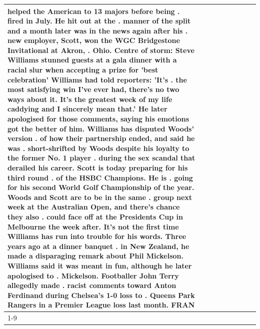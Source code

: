 \begin{table}[H]
\begin{tabular}{lllrlllll}
helped the American to 13 majors before being . fired in July. He hit out at the . manner of the split and a month later was in the news again after his . new employer, Scott, won the WGC Bridgestone Invitational at Akron, . Ohio. Centre of storm: Steve Williams stunned guests at a gala dinner with a racial slur when accepting a prize for 'best celebration' Williams had told reporters: 'It's . the most satisfying win I've ever had, there's no two ways about it. It's the greatest week of my life caddying and I sincerely mean that.' He later apologised for those comments, saying his emotions got the better of him. Williams has disputed Woods' version . of how their partnership ended, and said he was . short-shrifted by Woods despite his loyalty to the former No. 1 player . during the sex scandal that derailed his career. Scott is today preparing for his third round . of the HSBC Champions. He is . going for his second World Golf Championship of the year. Woods and Scott are to be in the same . group next week at the Australian Open, and there's chance they also . could face off at the Presidents Cup in Melbourne the week after. It's not the first time Williams has run into trouble for his words. Three years ago at a dinner banquet . in New Zealand, he made a disparaging remark about Phil Mickelson. Williams said it was meant in fun, although he later apologised to . Mickelson. Footballer John Terry allegedly made . racist comments toward Anton Ferdinand during Chelsea's 1-0 loss to . Queens Park Rangers in a Premier League loss last month. FRAN \\
\cline{1-9}

\end{tabular}
\end{table}
